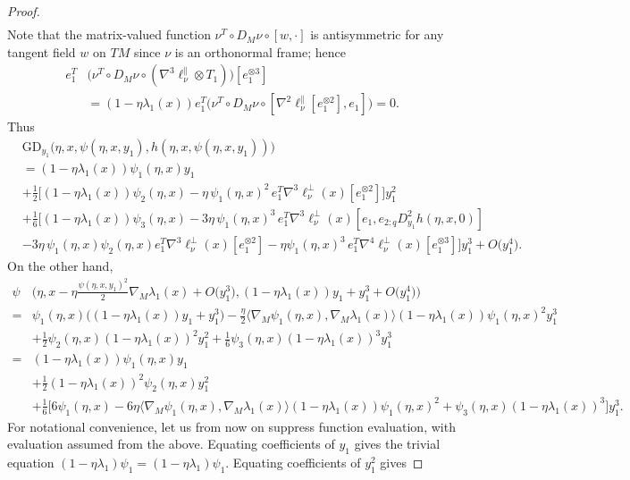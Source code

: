 \documentclass{article}
\newcommand{\GD}{\mathrm{GD}}
\theoremstyle{plain}
\theoremstyle{definition}
\theoremstyle{remark}
\begin{document}
\begin{proof}
\begin{align}
    \end{align}
    Note that the matrix-valued function $\nu^T\circ D_M\nu\circ [w,\cdot]$ is antisymmetric for any tangent field $w$ on $TM$ since $\nu$ is an orthonormal frame; hence
    \begin{align}
    e_1^T&\big(\nu ^T\circ D_M\nu \circ(\nabla^3\ell^{\parallel}_{\nu}\otimes T_1)\big)[e_1^{\otimes 3}]\\&=(1-\eta\lambda_1(x))e_1^T\big(\nu^T\circ D_M\nu\circ [\nabla^2\ell^{\parallel}_{\nu}[e_1^{\otimes 2}],e_1]\big) = 0.
    \end{align}
    Thus
    \begin{align}
        &\GD_{y_1}\big(\eta,x,\psi(\eta,x,y_1),h(\eta,x,\psi(\eta,x,y_1))\big)\\&=(1-\eta\lambda_1(x))\psi_1(\eta,x)y_1\\&+\frac{1}{2}\big[(1-\eta\lambda_1(x))\psi_2(\eta,x)-\eta\,\psi_1(\eta,x)^2\,e_1^T\nabla^3\ell_{\nu}^{\perp}(x)[e_1^{\otimes 2}]\big] y_1^2\\&+\frac{1}{6}\big[(1-\eta\lambda_1(x))\psi_3(\eta,x) - 3\eta\,\psi_1(\eta,x)^3\,e_1^T\nabla^3\ell^{\perp}_{\nu}(x)[e_1,e_{2:q}D^2_{y_1}h(\eta,x,0)]\\&-3\eta\,\psi_1(\eta,x)\psi_2(\eta,x)e_1^T\nabla^3\ell^{\perp}_{\nu}(x)[e_1^{\otimes 2}]-\eta\psi_1(\eta,x)^3\,e_1^T\nabla^4\ell^{\perp}_{\nu}(x)[e_1^{\otimes 3}]\big] y_1^3 + O\big( y_1^4\big).
    \end{align}
    On the other hand,
    \begin{align}
        \psi&\bigg(\eta,x-\eta\frac{\psi(\eta,x,y_1)^2}{2}\nabla_M\lambda_1(x) + O\big( y_1^3\big),(1-\eta\lambda_1(x))y_1 +  y_1^3 + O\big( y_1^4\big)\bigg)\\=&\psi_1(\eta,x)\big((1-\eta\lambda_1(x))y_1+  y_1^3\big) - \frac{\eta}{2}\langle\nabla_M\psi_1(\eta,x),\nabla_M\lambda_1(x)\rangle(1-\eta\lambda_1(x))\psi_1(\eta,x)^2 y_1^3\\&+\frac{1}{2}\psi_2(\eta,x)(1-\eta\lambda_1(x))^2 y_1^2 + \frac{1}{6}\psi_3(\eta,x)(1-\eta\lambda_1(x))^3 y_1^3\\=&(1-\eta\lambda_1(x))\psi_1(\eta,x)y_1\\&+\frac{1}{2}(1-\eta\lambda_1(x))^2\psi_2(\eta,x) y_1^2\\&+\frac{1}{6}\bigg[6\psi_1(\eta,x) -6\eta\langle\nabla_M\psi_1(\eta,x),\nabla_M\lambda_1(x)\rangle(1-\eta\lambda_1(x))\psi_1(\eta,x)^2 + \psi_3(\eta,x)(1-\eta\lambda_1(x))^3\bigg] y_1^3.
    \end{align}
    For notational convenience, let us from now on suppress function evaluation, with evaluation assumed from the above. Equating coefficients of $y_1$ gives the trivial equation $(1-\eta\lambda_1)\psi_1 = (1-\eta\lambda_1)\psi_1$. Equating coefficients of $ y_1^2$ gives

\end{proof}
\end{document}
